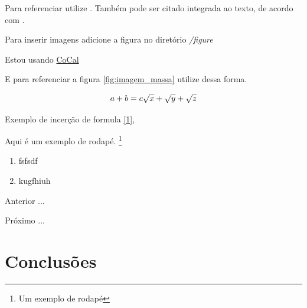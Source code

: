 Para referenciar utilize \cite{ninguem2022curioso}. Também pode ser citado integrada ao texto, de acordo com .

Para inserir imagens adicione a figura no diretório \textit{/figure}


\par Estou usando \href {https://cocalc.com/} {CoCal}

E para referenciar a figura \ref{fig:imagem_massa} utilize dessa forma.

\begin{equation}
  a + b = c \label{1}
  $$ $$ %
  \sqrt{x} + \sqrt{\smash[b]{y}} + \sqrt{z}
\end{equation}


\par Exemplo de incerção de formula \eqref{1},


Aqui é um exemplo de rodapé. \footnote{Um exemplo de rodapé}


\begin{enumerate}[label=\Roman{*}, ref=(\roman{*})]
  \item fsfsdf
  \item kugfhiuh
\end{enumerate}

\begin{asparaenum}
\item Anterior ... \cite{ninguem2022curioso}
\item Próximo ... \label{pl1}
\end{asparaenum}


\section{Conclusões}





